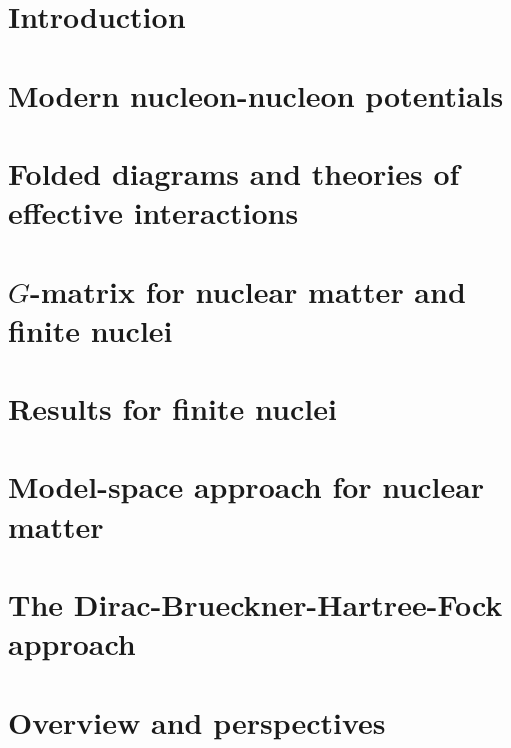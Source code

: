 \clearpage

\tableofcontents

\clearpage

\section{Introduction}





\section{Modern nucleon-nucleon potentials}


\section{Folded diagrams and theories of effective interactions}


\section{$G$-matrix for nuclear matter and finite nuclei}


\section{Results for finite nuclei}


\section{Model-space approach for nuclear matter}


\section{The Dirac-Brueckner-Hartree-Fock approach}


\section{Overview and perspectives}


\clearpage



\clearpage


